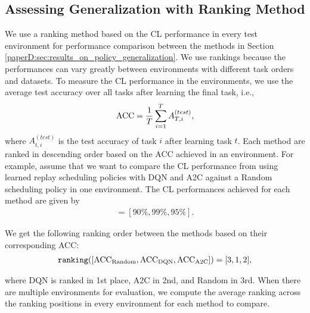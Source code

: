 \subsection*{Assessing Generalization with Ranking Method}\label{paperD:app:ranking_method}

We use a ranking method based on the CL performance in every test environment for performance comparison between the methods in Section \ref{paperD:sec:results_on_policy_generalization}. We use rankings because the performances can vary greatly between environments with different task orders and datasets. To measure the CL performance in the environments, we use the average test accuracy over all tasks after learning the final task, i.e.,
\begin{align*}
    {\text{ACC}} = \frac{1}{T} \sum_{i=1}^{T} A_{T, i}^{(test)},
\end{align*}
where $A_{t, i}^{(test)}$ is the test accuracy of task $i$ after learning task $t$. Each method are ranked in descending order based on the ACC achieved in an environment. For example, assume that we want to compare the CL performance from using learned replay scheduling policies with DQN and A2C against a Random scheduling policy in one environment. The CL performances achieved for each method are given by
\vspace{2mm}
\begin{align*}
    [\ACC_{\Random}, \ACC_{\DQN}, \ACC_{\text{A2C}}] = [90\%, 99\%, 95\%].
\end{align*}

We get the following ranking order between the methods based on their corresponding ACC:
\vspace{2mm}
\begin{align*}
    \texttt{ranking}([{\text{ACC}}_{\text{Random}}, {\text{ACC}}_{\text{DQN}}, {\text{ACC}}_{\text{A2C}}]) = [3, 1, 2],
\end{align*} 

where DQN is ranked in 1st place, A2C in 2nd, and Random in 3rd. When there are multiple environments for evaluation, we compute the average ranking across the ranking positions in every environment for each method to compare.

